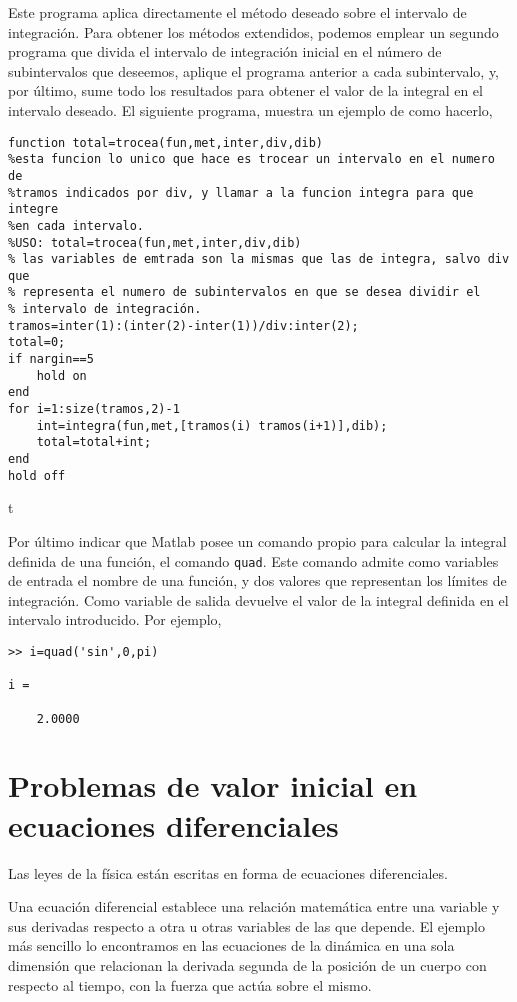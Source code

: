 Este programa aplica directamente el método deseado sobre el intervalo de integración. Para obtener los métodos extendidos, podemos emplear un segundo programa que divida el intervalo de integración inicial en el número de subintervalos que deseemos, aplique el programa anterior a cada subintervalo, y, por último, sume todo los resultados para obtener el valor de la integral en el intervalo deseado. El siguiente programa, muestra un ejemplo de como hacerlo,

\begin{verbatim}
function total=trocea(fun,met,inter,div,dib)
%esta funcion lo unico que hace es trocear un intervalo en el numero de
%tramos indicados por div, y llamar a la funcion integra para que integre
%en cada intervalo.
%USO: total=trocea(fun,met,inter,div,dib)
% las variables de emtrada son la mismas que las de integra, salvo div que
% representa el numero de subintervalos en que se desea dividir el
% intervalo de integración.
tramos=inter(1):(inter(2)-inter(1))/div:inter(2);
total=0;
if nargin==5
    hold on
end
for i=1:size(tramos,2)-1
    int=integra(fun,met,[tramos(i) tramos(i+1)],dib);
    total=total+int;
end
hold off
\end{verbatim}t

Por último indicar que Matlab posee un comando propio para calcular la integral definida de una función, el comando \texttt{quad}. Este comando admite como variables de entrada el nombre de una función, y dos valores que representan los límites de integración. Como variable de salida devuelve el valor de la integral definida en el intervalo introducido. Por ejemplo,

\begin{verbatim}
>> i=quad('sin',0,pi)

i =

    2.0000
\end{verbatim}


\section{Problemas de valor inicial en ecuaciones diferenciales}
Las leyes de la física están escritas en forma de ecuaciones diferenciales.  

Una ecuación diferencial establece una relación matemática entre una variable y sus derivadas respecto a otra u otras variables de las que depende. El ejemplo más sencillo lo encontramos en las ecuaciones de la dinámica en una sola dimensión que relacionan la derivada segunda de la posición de un cuerpo con respecto al tiempo, con la fuerza que actúa sobre el mismo.

